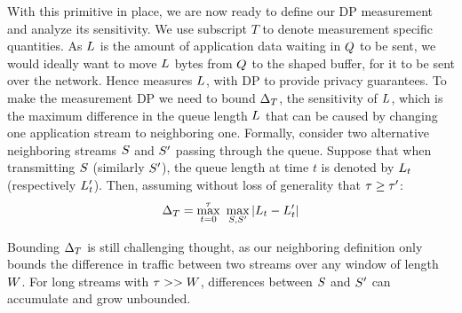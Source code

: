 With this primitive in place, we are now ready to define our DP measurement and
analyze its sensitivity. We use subscript $T$ to denote measurement specific
quantities.
As $L$ is the amount of application data waiting in $Q$ to be sent, we
would ideally want {\sys} to move $L$ bytes from $Q$ to the shaped
buffer, for it to be sent over the network.  Hence {\sys} measures $L$, with
DP to provide privacy guarantees. To make the measurement DP we need to bound
$\Delta_T$, the sensitivity of $L$, which is the maximum difference in the
queue length $L$ that can be caused  by changing one application stream to
neighboring one.
Formally, consider two alternative neighboring streams $S$ and
$S'$ passing through the queue.
Suppose that when transmitting $S$ (similarly $S'$), the
queue length at time $t$ is denoted by $L_{t}$ (respectively $L_{t}'$).
Then, assuming without loss of generality that $\tau \geq
\tau'$:
\setlength{\abovedisplayskip}{0pt}
\begin{equation}
    \Delta_T = \max_{t = 0}^{\tau}~\max_{S,
        S'} | L_{t} - L_{t}' |
    \label{eqn:ssens}
\end{equation}

Bounding $\Delta_T$ is still challenging thought, as our neighboring definition
only bounds the difference in traffic between two streams over any window of
length $W$.
For long streams with $\tau >> W$, differences between
$S$ and $S'$ can accumulate and grow unbounded.
\fi


